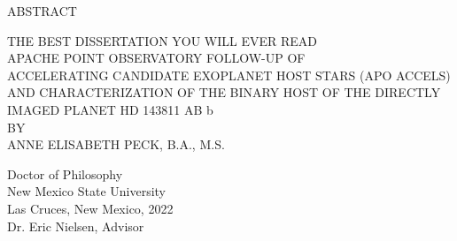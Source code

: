 \begin{center}
ABSTRACT
\end{center}

\bigskip

\begin{center}
THE BEST DISSERTATION YOU WILL EVER READ\\
APACHE POINT OBSERVATORY FOLLOW-UP OF \\
ACCELERATING CANDIDATE EXOPLANET HOST STARS (APO ACCELS)  \\
AND CHARACTERIZATION OF THE BINARY HOST OF THE DIRECTLY IMAGED PLANET HD 143811 AB b\\
\bigskip
BY\\
\bigskip
ANNE ELISABETH PECK, B.A., M.S.
\end{center}

\bigskip

\begin{center}
Doctor of Philosophy\\
New Mexico State University\\
Las Cruces, New Mexico, 2022\\
Dr. Eric Nielsen, Advisor
\end{center}

\bigskip
\bigskip






